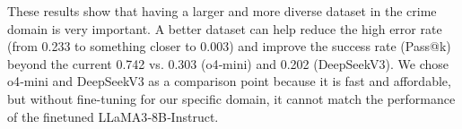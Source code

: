 These results show that having a larger and more diverse dataset in the crime domain is very important. A better dataset can help reduce the high error rate (from 0.233 to something closer to 0.003) and improve the success rate (Pass@k) beyond the current 0.742 vs. 0.303 (o4‑mini) and 0.202 (DeepSeekV3). We chose o4‑mini and DeepSeekV3 as a comparison point because it is fast and affordable, but without fine-tuning for our specific domain, it cannot match the performance of the finetuned LLaMA3‑8B‑Instruct.





